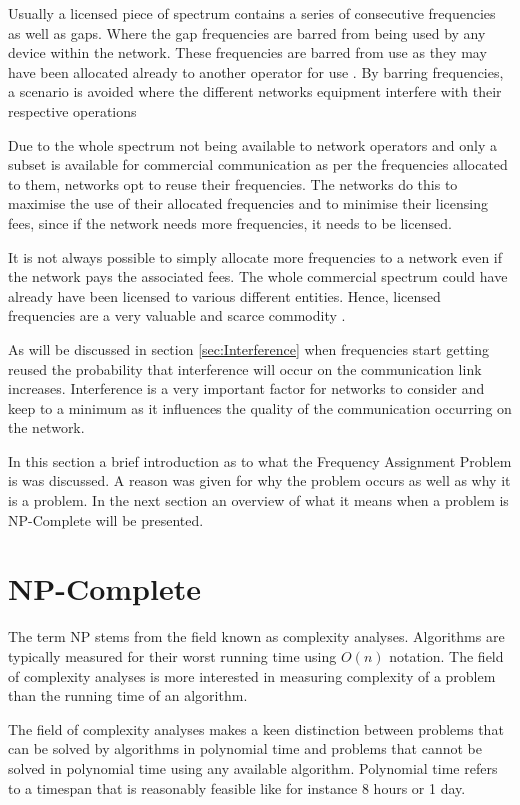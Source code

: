 Usually a licensed piece of spectrum contains a series of consecutive frequencies as well as gaps. Where the gap frequencies are barred from being used by any device within the network. These frequencies are barred from use as they may have been allocated already to another operator for use \cite{FAPInCell}. By barring frequencies, a scenario is avoided where the different networks equipment interfere with their respective operations \cite{FAPInCell}

Due to the whole spectrum not being available to network operators and only a subset is available for commercial communication as per the frequencies allocated to them, networks opt to reuse their frequencies\cite{FAPInCell}. The networks do this to maximise the use of their allocated frequencies and to minimise their licensing fees, since if the network needs more frequencies, it needs to be licensed\cite{FAPRAMColouring}.

It is not always possible to simply allocate more frequencies to a network even if the network pays the associated fees. The whole commercial spectrum could have already have been licensed to various different entities. Hence, licensed frequencies are a very valuable and scarce commodity \cite{FAPRAMColouring,FAPInCell,Eisenblatter,Karen2004}.

As will be discussed in section \ref{sec:Interference} when frequencies start getting reused the probability that interference will occur on the communication link increases. Interference is a very important factor for networks to consider and keep to a minimum as it influences the quality of the communication occurring on the network.


In this section a brief introduction as to what the Frequency Assignment Problem is was discussed. A reason was given for why the problem occurs as well as why it is a problem. In the next section an overview of what it means when a problem is NP-Complete will be presented.

\section{NP-Complete}
\label{sec:NPComplete}
The term NP stems from the field known as complexity analyses. Algorithms are typically measured for their worst running time using $O(n)$ notation. The field of complexity analyses is more interested in measuring complexity of a problem than the running time of an algorithm\cite{AIModernApproach}.

The field of complexity analyses makes a keen distinction between problems that can be solved by algorithms in polynomial time and problems that cannot be solved in polynomial time using any available algorithm\cite{AIModernApproach}. Polynomial time refers to a timespan that is reasonably feasible like for instance 8 hours or 1 day.

